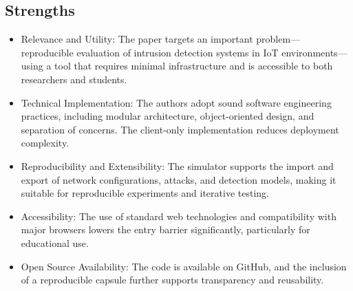 \documentclass[12pt, a4paper]{article}
\begin{document}
\subsection*{Strengths}
\begin{itemize}
    \item Relevance and Utility: The paper targets an important problem—reproducible evaluation of intrusion detection systems in IoT environments—using a tool that requires minimal infrastructure and is accessible to both researchers and students.
    \item Technical Implementation: The authors adopt sound software engineering practices, including modular architecture, object-oriented design, and separation of concerns. The client-only implementation reduces deployment complexity.
    \item Reproducibility and Extensibility: The simulator supports the import and export of network configurations, attacks, and detection models, making it suitable for reproducible experiments and iterative testing.
    \item Accessibility: The use of standard web technologies and compatibility with major browsers lowers the entry barrier significantly, particularly for educational use.
    \item Open Source Availability: The code is available on GitHub, and the inclusion of a reproducible capsule further supports transparency and reusability.
\end{itemize}
\end{document}
